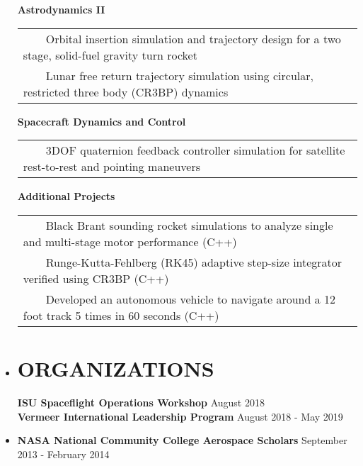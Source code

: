 \documentclass[overlapped, 11pt]{res}
\newcommand{\tabitem}{~~\textbullet~~}
\begin{document}
\begin{resume}
\begin{itemize}
            \textbf{Astrodynamics II} \\
                \begin{tabular}{l}
                    \tabitem Orbital insertion simulation and trajectory design for a two stage, solid-fuel gravity turn rocket \\
                    \tabitem Lunar free return trajectory simulation using circular, restricted three body (CR3BP) dynamics \\
                \end{tabular}
            
            \textbf{Spacecraft Dynamics and Control} \\
                \begin{tabular}{l}
                    \tabitem 3DOF quaternion feedback controller simulation for satellite rest-to-rest and pointing maneuvers\\
                \end{tabular}
                
            \textbf{Additional Projects} \\
                \begin{tabular}{l}
                    \tabitem Black Brant sounding rocket simulations to analyze single and multi-stage motor performance (C++)\\
                    \tabitem Runge-Kutta-Fehlberg (RK45) adaptive step-size integrator verified using CR3BP (C++) \\
                    \tabitem Developed an autonomous vehicle to navigate around a 12 foot track 5 times in 60 seconds (C++)
                \end{tabular}

        \item[]\section{ORGANIZATIONS}
            \textbf{ISU Spaceflight Operations Workshop}
                \hfill August 2018 \\
            \textbf{Vermeer International Leadership Program}
                \hfill August 2018 - May 2019 
            \item[] \textbf{NASA National Community College Aerospace Scholars}
                \hfill September 2013 - February 2014
        
        \end{itemize}
    \end{resume}
\end{document}
